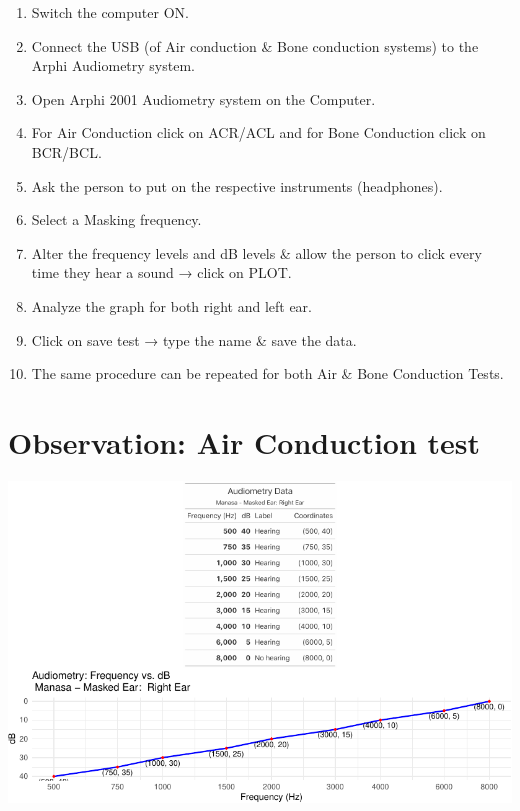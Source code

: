 \documentclass[
  11pt,
  letterpaper,
  DIV=11,
  numbers=noendperiod]{scrreprt}
\providecommand{\tightlist}{%
  \setlength{\itemsep}{0pt}\setlength{\parskip}{0pt}}\usepackage{longtable,booktabs,array}
\begin{document}
\begin{enumerate}
\def\labelenumi{\arabic{enumi}.}
\tightlist
\item
  Switch the computer ON.
\item
  Connect the USB (of Air conduction \& Bone conduction systems) to the
  Arphi Audiometry system.
\item
  Open Arphi 2001 Audiometry system on the Computer.
\item
  For Air Conduction click on ACR/ACL and for Bone Conduction click on
  BCR/BCL.
\item
  Ask the person to put on the respective instruments (headphones).
\item
  Select a Masking frequency.
\item
  Alter the frequency levels and dB levels \& allow the person to click
  every time they hear a sound → click on PLOT.
\item
  Analyze the graph for both right and left ear.
\item
  Click on save test → type the name \& save the data.
\item
  The same procedure can be repeated for both Air \& Bone Conduction
  Tests.
\end{enumerate}

\section{Observation: Air Conduction
test}\label{observation-air-conduction-test}

\includegraphics{audiometry_files/figure-pdf/unnamed-chunk-1-1.pdf}
\end{document}
